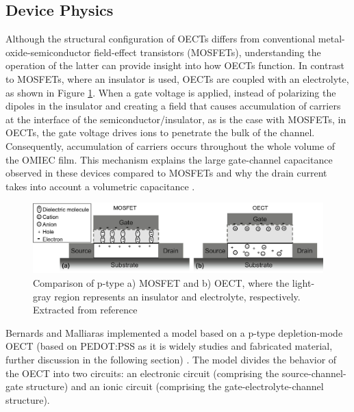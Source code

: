 

\subsection{Device Physics} \label{subsec:devphy}

Although the structural configuration of OECTs differs from conventional metal-oxide-semiconductor field-effect transistors (MOSFETs), understanding the operation of the latter can provide insight into how OECTs function. In contrast to MOSFETs, where an insulator is used, OECTs are coupled with an electrolyte, as shown in Figure \ref{fig:vsMOS}. When a gate voltage is applied, instead of polarizing the dipoles in the insulator and creating a field that causes accumulation of carriers at the interface of the semiconductor/insulator, as is the case with MOSFETs, in OECTs, the gate voltage drives ions to penetrate the bulk of the channel. Consequently, accumulation of carriers occurs throughout the whole volume of the OMIEC film. This mechanism explains the large gate-channel capacitance observed in these devices compared to MOSFETs and why the drain current takes into account a volumetric capacitance \cite{friedleinDevicePhysicsOrganic2018}.


\begin{figure}[ht]
  \centering
  \includegraphics[width=\textwidth]{Images/pdf/MOSFETvsOECTs.pdf}
  \caption[Device physics of MOSFET vs OECT]{Comparison of p-type a) MOSFET and b) OECT, where the light-gray region represents an insulator and electrolyte, respectively. Extracted from reference  \cite{friedleinDevicePhysicsOrganic2018}}
  \label{fig:vsMOS}
\end{figure}

Bernards and Malliaras implemented a model based on a p-type depletion-mode OECT (based on PEDOT:PSS as it is widely studies and fabricated material, further discussion in the following section) \cite{bernardsSteadyStateTransientBehavior2007}. The model divides the behavior of the OECT into two circuits: an electronic circuit (comprising the source-channel-gate structure) and an ionic circuit (comprising the gate-electrolyte-channel structure).

